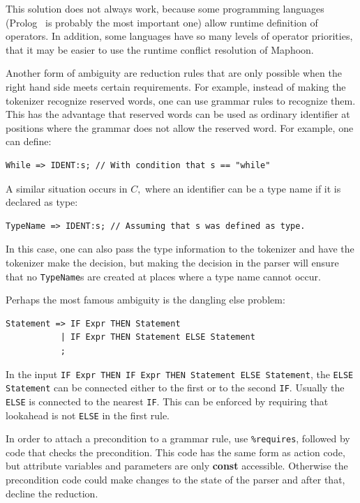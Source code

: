 \documentclass{article}
\begin{document}
\noindent
This solution does not always work, because
some programming languages 
(Prolog~\cite{SterlingShapiro94} is probably the most important one) allow
runtime definition of operators.
In addition, some languages have so many levels of operator priorities,
that it may be easier
to use the runtime conflict resolution of Maphoon. 

Another form of ambiguity are reduction rules that are only
possible when the right hand side meets certain requirements.
For example, instead of making the tokenizer recognize reserved words,
one can use grammar rules to recognize them. 
This has the advantage that reserved words can be used as ordinary identifier
at positions where the grammar does not allow the reserved word. 
For example, one can define:
\begin{verbatim}
While => IDENT:s; // With condition that s == "while" \end{verbatim}

\noindent
A similar situation occurs in $ C, $ where an identifier can be
a type name if it is declared as type:
\begin{verbatim}
TypeName => IDENT:s; // Assuming that s was defined as type. \end{verbatim}
In this case, one can also pass the type information to the tokenizer
and have the tokenizer make the decision, but making the decision
in the parser will ensure that no \verb+TypeName+s are created
at places where a type name cannot occur. 

\noindent
Perhaps the most famous ambiguity is the dangling else problem:
\begin{verbatim}
Statement => IF Expr THEN Statement
           | IF Expr THEN Statement ELSE Statement  
           ;   \end{verbatim}
In the input \verb+IF Expr THEN IF Expr THEN Statement ELSE Statement+,
the \verb+ELSE Statement+ can be connected either to the 
first or to the second \verb+IF+.
Usually the \verb+ELSE+ is connected to the
nearest \verb+IF+. This can be enforced by requiring that
lookahead is not \verb+ELSE+ in the first rule.

In order to attach a precondition to a grammar rule, use 
\verb+%requires+, followed by code that checks the precondition.
This code has the same form as action code, but attribute variables
and parameters are only {\bf const} accessible. Otherwise
the precondition code could make changes to the state of the parser
and after that, decline the reduction. 
\end{document}
